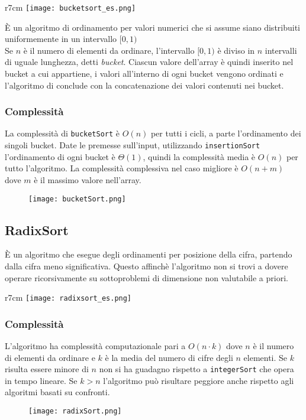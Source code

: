 \begin{wrapfigure}{r}{7cm}
    \texttt{[image: bucketsort\_es.png]}
\end{wrapfigure}

È un algoritmo di ordinamento per valori numerici che si assume siano distribuiti
uniformemente in un intervallo $[0,1)$\\
Se $n$ è il numero di elementi da ordinare, l'intervallo $[0,1)$ è diviso in $n$
intervalli di uguale lunghezza, detti \emph{bucket}.
Ciascun valore dell'array è quindi inserito nel bucket a cui appartiene, i valori
all'interno di ogni bucket vengono ordinati e l'algoritmo di conclude con la concatenazione
dei valori contenuti nei bucket.

\subsubsection*{Complessità}
La complessità di \texttt{bucketSort} è $O(n)$ per tutti i cicli, a parte l'ordinamento dei 
singoli bucket. Date le premesse sull'input, utilizzando \texttt{insertionSort}
l'ordinamento di ogni bucket è $\Theta(1)$, quindi la complessità media è
$O(n)$ per tutto l'algoritmo. La complessità complessiva nel caso migliore è 
$O(n+m)$ dove $m$ è il massimo valore nell'array.

\begin{figure}[h]
    \texttt{[image: bucketSort.png]}
\end{figure}
\clearpage
\subsection{RadixSort}
È un algoritmo che esegue degli ordinamenti per posizione della cifra, partendo 
dalla cifra meno significativa. Questo affinchè l'algoritmo non si trovi a dovere
operare ricorsivamente su sottoproblemi di dimensione non valutabile a priori.

\begin{wrapfigure}{r}{7cm}
    \texttt{[image: radixsort\_es.png]}
\end{wrapfigure}

\subsubsection*{Complessità}
L'algoritmo ha complessità computazionale pari a $O(n\cdot k)$ dove $n$ è 
il numero di elementi da ordinare e $k$ è la media del numero di cifre degli $n$ elementi.
Se $k$ risulta essere minore di $n$ non si ha guadagno rispetto a \texttt{integerSort}
che opera in tempo lineare. Se $k > n$ l'algoritmo può risultare peggiore anche 
rispetto agli algoritmi basati su confronti.
\begin{figure}[h]
    \texttt{[image: radixSort.png]}
\end{figure}
\clearpage
